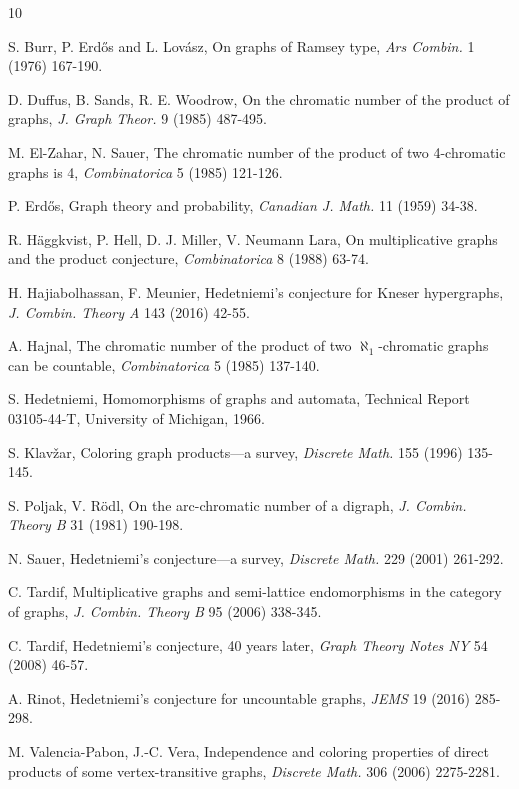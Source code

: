 \documentclass{amsart}
\theoremstyle{definition}
\theoremstyle{remark}
\numberwithin{equation}{section}
\begin{document}
\begin{thebibliography}{10}

S. Burr, P. Erd\H{o}s and L. Lov\'{a}sz, On graphs of Ramsey type, \textit{Ars Combin.} 1 (1976) 167-190.

D. Duffus, B. Sands, R. E. Woodrow, On the chromatic number of the product of graphs, \textit{J. Graph Theor.} 9 (1985) 487-495.

M. El-Zahar, N. Sauer, The chromatic number of the product of two 4-chromatic graphs is 4, \textit{Combinatorica} 5 (1985) 121-126.

P. Erd\H{o}s, Graph theory and probability, \textit{Canadian J. Math.} 11 (1959) 34-38.

R. H\"{a}ggkvist, P. Hell, D. J. Miller, V. Neumann Lara, On multiplicative graphs and the product conjecture, \textit{Combinatorica} 8 (1988) 63-74.

H. Hajiabolhassan, F. Meunier, Hedetniemi's conjecture for Kneser hypergraphs, \textit{J. Combin. Theory A} 143 (2016) 42-55.

A. Hajnal, The chromatic number of the product of two $\aleph_1$-chromatic graphs can be countable, \textit{Combinatorica} 5 (1985) 137-140.

S. Hedetniemi, Homomorphisms of graphs and automata, Technical Report 03105-44-T, University of Michigan, 1966.

S. Klav\v{z}ar, Coloring graph products---a survey, \textit{Discrete Math.} 155 (1996) 135-145.

S. Poljak, V. R\"{o}dl, On the arc-chromatic number of a digraph, \textit{J. Combin. Theory B} 31 (1981) 190-198.


N. Sauer, Hedetniemi's conjecture---a survey, \textit{Discrete Math.} 229 (2001) 261-292.

C. Tardif, Multiplicative graphs and semi-lattice endomorphisms in the category of graphs, \textit{J. Combin. Theory B} 95 (2006) 338-345.

C. Tardif, Hedetniemi's conjecture, 40 years later, \textit{Graph Theory Notes NY} 54 (2008) 46-57.



A. Rinot, Hedetniemi's conjecture for uncountable graphs, \textit{JEMS} 19 (2016) 285-298. %

M. Valencia-Pabon, J.-C. Vera, Independence and coloring properties of direct products of some vertex-transitive graphs, \textit{Discrete Math.} 306 (2006) 2275-2281.


\end{thebibliography}
\end{document}
